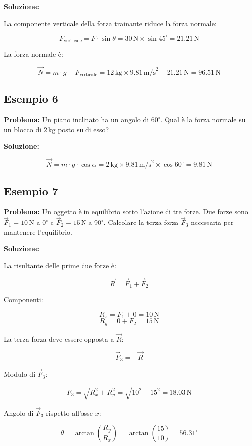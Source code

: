 \documentclass[a4paper,12pt]{article}
\begin{document}
\textbf{Soluzione:}

La componente verticale della forza trainante riduce la forza normale:

\[
F_{\text{verticale}} = F \cdot \sin{\theta} = 30\,\text{N} \times \sin{45^\circ} = 21.21\,\text{N}
\]

La forza normale è:

\[
\vec{N} = m \cdot g - F_{\text{verticale}} = 12\,\text{kg} \times 9.81\,\text{m/s}^2 - 21.21\,\text{N} = 96.51\,\text{N}
\]

\subsection*{Esempio 6}

\textbf{Problema:} Un piano inclinato ha un angolo di $60^\circ$. Qual è la forza normale su un blocco di $2\,\text{kg}$ posto su di esso?

\textbf{Soluzione:}

\[
\vec{N} = m \cdot g \cdot \cos{\alpha} = 2\,\text{kg} \times 9.81\,\text{m/s}^2 \times \cos{60^\circ} = 9.81\,\text{N}
\]

\subsection*{Esempio 7}

\textbf{Problema:} Un oggetto è in equilibrio sotto l'azione di tre forze. Due forze sono $\vec{F}_1 = 10\,\text{N}$ a $0^\circ$ e $\vec{F}_2 = 15\,\text{N}$ a $90^\circ$. Calcolare la terza forza $\vec{F}_3$ necessaria per mantenere l'equilibrio.

\textbf{Soluzione:}

La risultante delle prime due forze è:

\[
\vec{R} = \vec{F}_1 + \vec{F}_2
\]

Componenti:

\[
R_x = F_1 + 0 = 10\,\text{N}
\]
\[
R_y = 0 + F_2 = 15\,\text{N}
\]

La terza forza deve essere opposta a $\vec{R}$:

\[
\vec{F}_3 = -\vec{R}
\]

Modulo di $\vec{F}_3$:

\[
F_3 = \sqrt{R_x^2 + R_y^2} = \sqrt{10^2 + 15^2} = 18.03\,\text{N}
\]

Angolo di $\vec{F}_3$ rispetto all'asse $x$:

\[
\theta = \arctan{\left(\frac{R_y}{R_x}\right)} = \arctan{\left(\frac{15}{10}\right)} = 56.31^\circ
\]
\end{document}
